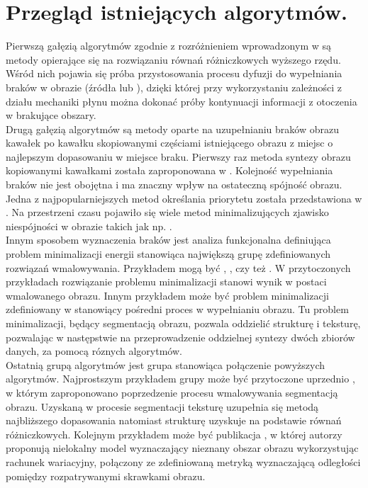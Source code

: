 \documentclass[12pt, twoside, openany]{report}
\theoremstyle{definition}
\begin{document}
\chapter{Przegląd istniejących algorytmów.}
Pierwszą gałęzią algorytmów zgodnie z rozróżnieniem wprowadzonym w  \cite{SalientStrucTexProp} są metody opierające się na rozwiązaniu równań różniczkowych wyższego rzędu. Wśród nich pojawia się próba przystosowania procesu dyfuzji do wypełniania braków w obrazie (źródła \cite{bertalmio2000image} lub \cite{BertalmioNavierStokes}), dzięki której przy wykorzystaniu zależności z działu mechaniki płynu można dokonać próby kontynuacji informacji z otoczenia w brakujące obszary. \\
Drugą gałęzią algorytmów są metody oparte na uzupełnianiu braków obrazu kawałek po kawałku skopiowanymi częściami istniejącego obrazu z miejsc o najlepszym dopasowaniu w miejsce braku. Pierwszy raz metoda syntezy obrazu kopiowanymi kawałkami została zaproponowana w \cite{efros1999texture}. Kolejność wypełniania braków nie jest obojętna i ma znaczny wpływ na ostateczną spójność obrazu. Jedna z najpopularniejszych metod określania priorytetu została przedstawiona w \cite{criminisi2004region}. Na przestrzeni czasu pojawiło się wiele metod minimalizujących zjawisko niespójności w obrazie takich jak np. \cite{StructurePropagationManual}. \\
Innym sposobem wyznaczenia braków jest analiza funkcjonalna definiująca problem minimalizacji energii stanowiąca największą grupę zdefiniowanych rozwiązań wmalowywania. Przykładem mogą być \cite{MathematicalModelsforNLTextureInpainting}, \cite{ColorTextureInpaintingNLCTVModel}, czy też \cite{arias2011variational}. W przytoczonych przykładach rozwiązanie problemu minimalizacji stanowi wynik w postaci wmalowanego obrazu. Innym przykładem może być problem minimalizacji zdefiniowany w \cite{SalientStrucTexProp} stanowiący pośredni proces w wypełnianiu obrazu. Tu problem minimalizacji, będący segmentacją obrazu, pozwala oddzielić strukturę i teksturę, pozwalając w następstwie na przeprowadzenie oddzielnej syntezy dwóch zbiorów danych, za pomocą róznych algorytmów. \\
Ostatnią grupą algorytmów jest grupa stanowiąca połączenie powyższych algorytmów. Najprostszym przykładem grupy może być przytoczone uprzednio \cite{NavierStokesAndTexturePropagation}, w którym zaproponowano poprzedzenie procesu wmalowywania segmentacją obrazu. Uzyskaną w procesie segmentacji teksturę uzupełnia się metodą najbliższego dopasowania natomiast strukturę uzyskuje na podstawie równań różniczkowych. Kolejnym przykładem może być publikacja \cite{arias2011variational}, w której autorzy proponują nielokalny model wyznaczający nieznany obszar obrazu wykorzystując rachunek wariacyjny, połączony ze zdefiniowaną metryką wyznaczającą odległości pomiędzy rozpatrywanymi skrawkami obrazu. \\
\end{document}
